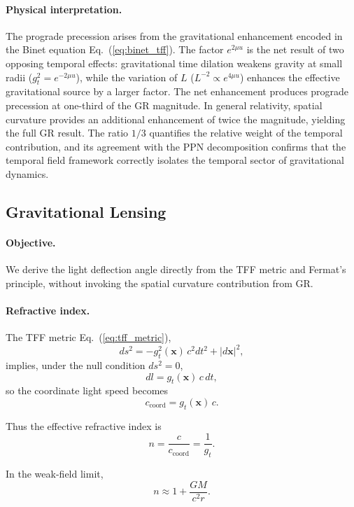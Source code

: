 \documentclass[12pt]{article}
\begin{document}
\paragraph{Physical interpretation.}
The prograde precession arises from the gravitational enhancement encoded in the Binet equation Eq.~(\ref{eq:binet_tff}). The factor $e^{2\mu u}$ is the net result of two opposing temporal effects: gravitational time dilation weakens gravity at small radii ($g_t^2 = e^{-2\mu u}$), while the variation of $L$ ($L^{-2} \propto e^{4\mu u}$) enhances the effective gravitational source by a larger factor. The net enhancement produces prograde precession at one-third of the GR magnitude. In general relativity, spatial curvature provides an additional enhancement of twice the magnitude, yielding the full GR result. The ratio $1/3$ quantifies the relative weight of the temporal contribution, and its agreement with the PPN decomposition confirms that the temporal field framework correctly isolates the temporal sector of gravitational dynamics.

\subsection{Gravitational Lensing}
\label{sec:lensing}

\paragraph{Objective.}
We derive the light deflection angle directly from the TFF metric and Fermat's principle, without invoking the spatial curvature contribution from GR.

\paragraph{Refractive index.}
The TFF metric Eq.~(\ref{eq:tff_metric}),
$$
ds^2 = -g_t^2(\mathbf{x})\, c^2 dt^2 + |d\mathbf{x}|^2 ,
$$
implies, under the null condition $ds^2 = 0$,
$$
dl = g_t(\mathbf{x})\, c\, dt ,
$$
so the coordinate light speed becomes
$$
c_{\text{coord}} = g_t(\mathbf{x})\, c .
$$

Thus the effective refractive index is
\begin{equation}
n = \frac{c}{c_{\text{coord}}} = \frac{1}{g_t} .
\end{equation}

In the weak-field limit,
\begin{equation}
n \approx 1 + \frac{GM}{c^2 r} .
\end{equation}
\end{document}
